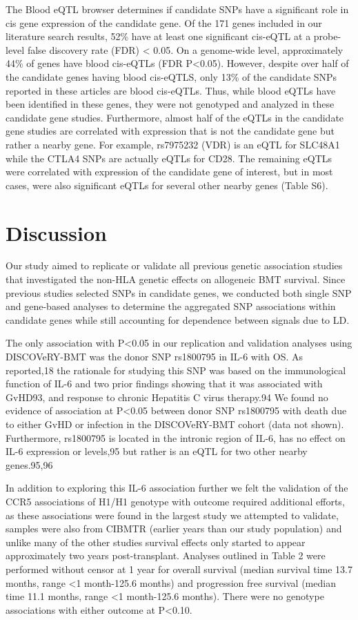 \documentclass[]{DissertateUSU}
\begin{document}
The Blood eQTL browser determines if candidate SNPs have a significant
role in cis gene expression of the candidate gene. Of the 171 genes
included in our literature search results, 52\% have at least one
significant cis-eQTL at a probe-level false discovery rate (FDR)
\textless{} 0.05. On a genome-wide level, approximately 44\% of genes
have blood cis-eQTLs (FDR P\textless{}0.05). However, despite over half
of the candidate genes having blood cis-eQTLS, only 13\% of the
candidate SNPs reported in these articles are blood cis-eQTLs. Thus,
while blood eQTLs have been identified in these genes, they were not
genotyped and analyzed in these candidate gene studies. Furthermore,
almost half of the eQTLs in the candidate gene studies are correlated
with expression that is not the candidate gene but rather a nearby gene.
For example, rs7975232 (VDR) is an eQTL for SLC48A1 while the CTLA4 SNPs
are actually eQTLs for CD28. The remaining eQTLs were correlated with
expression of the candidate gene of interest, but in most cases, were
also significant eQTLs for several other nearby genes (Table S6).

\section{Discussion}\label{discussion}

Our study aimed to replicate or validate all previous genetic
association studies that investigated the non-HLA genetic effects on
allogeneic BMT survival. Since previous studies selected SNPs in
candidate genes, we conducted both single SNP and gene-based analyses to
determine the aggregated SNP associations within candidate genes while
still accounting for dependence between signals due to LD.

The only association with P\textless{}0.05 in our replication and
validation analyses using DISCOVeRY-BMT was the donor SNP rs1800795 in
IL-6 with OS. As reported,18 the rationale for studying this SNP was
based on the immunological function of IL-6 and two prior findings
showing that it was associated with GvHD93, and response to chronic
Hepatitis C virus therapy.94 We found no evidence of association at
P\textless{}0.05 between donor SNP rs1800795 with death due to either
GvHD or infection in the DISCOVeRY-BMT cohort (data not shown).
Furthermore, rs1800795 is located in the intronic region of IL-6, has no
effect on IL-6 expression or levels,95 but rather is an eQTL for two
other nearby genes.95,96

In addition to exploring this IL-6 association further we felt the
validation of the CCR5 associations of H1/H1 genotype with outcome
required additional efforts, as these associations were found in the
largest study we attempted to validate, samples were also from CIBMTR
(earlier years than our study population) and unlike many of the other
studies survival effects only started to appear approximately two years
post-transplant. Analyses outlined in Table 2 were performed without
censor at 1 year for overall survival (median survival time 13.7 months,
range \textless{}1 month-125.6 months) and progression free survival
(median time 11.1 months, range \textless{}1 month-125.6 months). There
were no genotype associations with either outcome at P\textless{}0.10.
\end{document}
